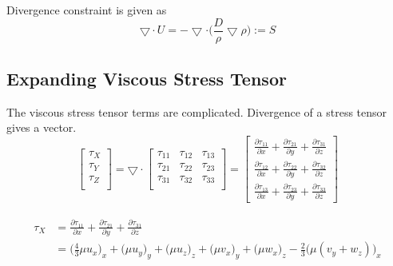 \documentclass{article}
\numberwithin{equation}{subsection}
\begin{document}
Divergence constraint is given as
\begin{equation}
    \bigtriangledown \cdot U = - \bigtriangledown \cdot \Bigg(\frac{D}{\rho} \bigtriangledown \rho\Bigg) := S
\end{equation}



\subsection {Expanding Viscous Stress Tensor}
The viscous stress tensor terms are complicated. Divergence of a stress tensor gives a vector.
\begin{equation}
    \left[\begin{array}{c}
        \tau_X \\
        \tau_Y \\
        \tau_Z \\
    \end{array}\right]
    = \bigtriangledown \cdot \begin{bmatrix}
        \tau_{11} & \tau_{12} & \tau_{13} \\
        \tau_{21} & \tau_{22} & \tau_{23} \\
        \tau_{31} & \tau_{32} & \tau_{33} \\
    \end{bmatrix}
    = \left[\begin{array}{c}
        \frac{\partial \tau_{11}}{\partial x} + \frac{\partial \tau_{21}}{\partial y} + \frac{\partial \tau_{31}}{\partial z}\\
    \frac{\partial \tau_{12}}{\partial x} + \frac{\partial \tau_{22}}{\partial y} + \frac{\partial \tau_{32}}{\partial z} \\
    \frac{\partial \tau_{13}}{\partial x} + \frac{\partial \tau_{23}}{\partial y} + \frac{\partial \tau_{33}}{\partial z}
    \end{array}\right]
\end{equation}

\begin{align}
\begin{split}
    \tau_X &= \frac{\partial \tau_{11}}{\partial x} + \frac{\partial \tau_{21}}{\partial y} + \frac{\partial \tau_{31}}{\partial z}\\
    &= \Big(\frac{4}{3}\mu u_x \Big)_x + \Big(\mu u_y\Big)_y + \Big(\mu u_z\Big)_z + \Big(\mu v_x \Big)_y + \Big(\mu w_x\Big)_z - \frac{2}{3}\Big(\mu(v_y + w_z)\Big)_x
\end{split}
\end{align}
\end{document}
